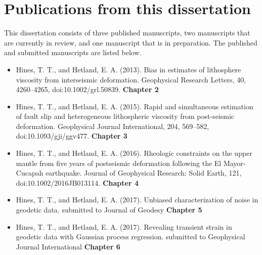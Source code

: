 \section{Publications from this dissertation}
This dissertation consists of three published manuscripts, two
manuscripts that are currently in review, and one manuscript that is
in preparation. The published and submitted manuscripts are listed
below.

\begin{itemize}
\item{Hines, T. T., and Hetland, E. A. (2013). Bias in estimates of lithosphere viscosity from interseismic deformation. Geophysical Research Letters, 40, 4260--4265, doi:10.1002/grl.50839. \textbf{Chapter 2}}  
\item{Hines, T. T., and Hetland, E. A. (2015). Rapid and simultaneous estimation of fault slip and heterogeneous lithospheric viscosity from post-seismic deformation. Geophysical Journal International, 204, 569–582, doi:10.1093/gji/ggv477. \textbf{Chapter 3}} 
\item{Hines, T. T., and Hetland, E. A. (2016). Rheologic constraints on the upper mantle from five years of postseismic deformation following the El Mayor-Cucapah earthquake. Journal of Geophysical Research: Solid Earth, 121, doi:10.1002/2016JB013114. \textbf{Chapter 4}}
\item{Hines, T. T., and Hetland, E. A. (2017). Unbiased characterization of noise in geodetic data. submitted to Journal of Geodesy \textbf{Chapter 5}}
\item{Hines, T. T., and Hetland, E. A. (2017). Revealing transient strain in geodetic data with Gaussian process regression. submitted to Geophysical Journal International \textbf{Chapter 6}} 
\end{itemize}
